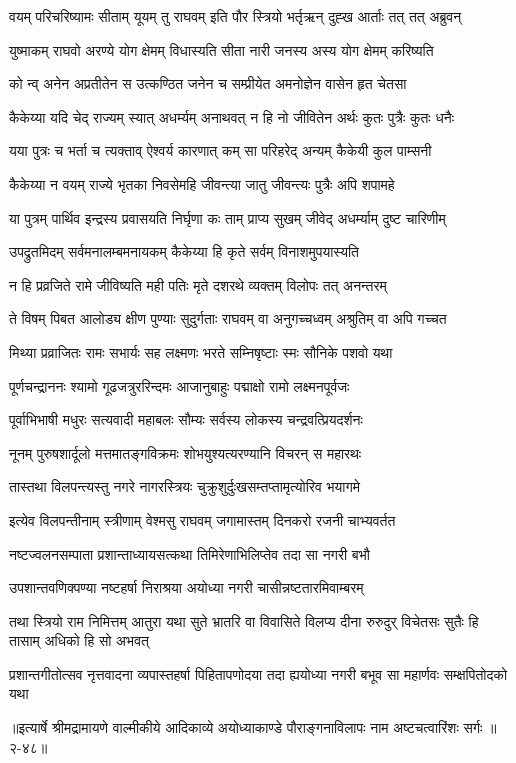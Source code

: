 \twolineshloka
{वयम् परिचरिष्यामः सीताम् यूयम् तु राघवम्}
{इति पौर स्त्रियो भर्तृऋन् दुह्ख आर्ताः तत् तत् अब्रुवन्} %

\twolineshloka
{युष्माकम् राघवो अरण्ये योग क्षेमम् विधास्यति}
{सीता नारी जनस्य अस्य योग क्षेमम् करिष्यति} %

\twolineshloka
{को न्व् अनेन अप्रतीतेन स उत्कण्ठित जनेन च}
{सम्प्रीयेत अमनोज्ञेन वासेन हृत चेतसा} %

\twolineshloka
{कैकेय्या यदि चेद् राज्यम् स्यात् अधर्म्यम् अनाथवत्}
{न हि नो जीवितेन अर्थः कुतः पुत्रैः कुतः धनैः} %

\twolineshloka
{यया पुत्रः च भर्ता च त्यक्ताव् ऐश्वर्य कारणात्}
{कम् सा परिहरेद् अन्यम् कैकेयी कुल पाम्सनी} %

\twolineshloka
{कैकेय्या न वयम् राज्ये भृतका निवसेमहि}
{जीवन्त्या जातु जीवन्त्यः पुत्रैः अपि शपामहे} %

\twolineshloka
{या पुत्रम् पार्थिव इन्द्रस्य प्रवासयति निर्घृणा}
{कः ताम् प्राप्य सुखम् जीवेद् अधर्म्याम् दुष्ट चारिणीम्} %

\twolineshloka
{उपद्रुतमिदम् सर्वमनालम्बमनायकम्}
{कैकेय्या हि कृते सर्वम् विनाशमुपयास्यति} %

\twolineshloka
{न हि प्रव्रजिते रामे जीविष्यति मही पतिः}
{मृते दशरथे व्यक्तम् विलोपः तत् अनन्तरम्} %

\twolineshloka
{ते विषम् पिबत आलोड्य क्षीण पुण्याः सुदुर्गताः}
{राघवम् वा अनुगच्चध्वम् अश्रुतिम् वा अपि गच्चत} %

\twolineshloka
{मिथ्या प्रव्राजितः रामः सभार्यः सह लक्ष्मणः}
{भरते सम्निषृष्टाः स्मः सौनिके पशवो यथा} %

\twolineshloka
{पूर्णचन्द्राननः श्यामो गूढजत्रुररिन्दमः}
{आजानुबाहुः पद्माक्षो रामो लक्ष्मनपूर्वजः} %

\twolineshloka
{पूर्वाभिभाषी मधुरः सत्यवादी महाबलः}
{सौम्यः सर्वस्य लोकस्य चन्द्रवत्प्रियदर्शनः} %

\twolineshloka
{नूनम् पुरुषशार्दूलो मत्तमातङ्गविक्रमः}
{शोभयुश्यत्यरण्यानि विचरन् स महारथः} %

\twolineshloka
{तास्तथा विलपन्त्यस्तु नगरे नागरस्त्रियः}
{चुक्रुशुर्दुःखसम्तप्तामृत्योरिव भयागमे} %

\twolineshloka
{इत्येव विलपन्तीनाम् स्त्रीणाम् वेश्मसु राघवम्}
{जगामास्तम् दिनकरो रजनी चाभ्यवर्तत} %

\twolineshloka
{नष्टज्वलनसम्पाता प्रशान्ताध्यायसत्कथा}
{तिमिरेणाभिलिप्तेव तदा सा नगरी बभौ} %

\twolineshloka
{उपशान्तवणिक्पण्या नष्टहर्षा निराश्रया}
{अयोध्या नगरी चासीन्नष्टतारमिवाम्बरम्} %

\fourlineindentedshloka
{तथा स्त्रियो राम निमित्तम् आतुरा}
{यथा सुते भ्रातरि वा विवासिते}
{विलप्य दीना रुरुदुर् विचेतसः}
{सुतैः हि तासाम् अधिको हि सो अभवत्} %

\fourlineindentedshloka
{प्रशान्तगीतोत्सव नृत्तवादना}
{व्यपास्तहर्षा पिहितापणोदया}
{तदा ह्ययोध्या नगरी बभूव सा}
{महार्णवः सम्क्षपितोदको यथा} %


॥इत्यार्षे श्रीमद्रामायणे वाल्मीकीये आदिकाव्ये अयोध्याकाण्डे पौराङ्गनाविलापः नाम अष्टचत्वारिंशः सर्गः ॥२-४८॥
